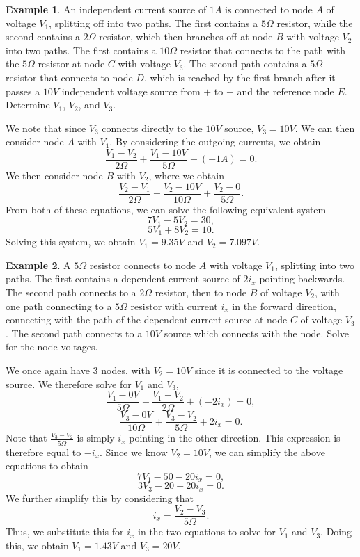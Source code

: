 \documentclass[11pt]{article}
\theoremstyle{plain} %
\theoremstyle{definition}
\theoremstyle{example}
\newtheorem*{example}{Example}
\theoremstyle{remark}
\begin{document}
\begin{example}
An independent current source of $1A$ is connected to node $A$ of voltage $V_1$, splitting off into two paths. The first contains a $5\Omega$ resistor, while the second contains a $2\Omega$ resistor, which then branches off at node $B$ with voltage $V_2$ into two paths. The first contains a $10\Omega$ resistor that connects to the path with the $5\Omega$ resistor at node $C$ with voltage $V_3$. The second path contains a $5\Omega$ resistor that connects to node $D$, which is reached by the first branch after it passes a $10V$ independent voltage source from $+$ to $-$ and the reference node $E$. Determine $V_1$, $V_2$, and $V_3$. 
\end{example}

We note that since $V_3$ connects directly to the $10V$ source, $V_3 = 10V$. We can then consider node $A$ with $V_1$. By considering the outgoing currents, we obtain 
$$\frac{V_1-V_2}{2\Omega} + \frac{V_1-10V}{5\Omega} + (-1A) = 0.$$
We then consider node $B$ with $V_2$, where we obtain
$$\frac{V_2-V_1}{2\Omega} + \frac{V_2-10V}{10\Omega} + \frac{V_2-0}{5\Omega}.$$
From both of these equations, we can solve the following equivalent system
$$7V_1-5V_2 = 30,$$
$$5V_1+8V_2 = 10.$$
Solving this system, we obtain $V_1 = 9.35V$ and $V_2 =  7.097V$. 

\begin{example}
A $5\Omega$ resistor connects to node $A$ with voltage $V_1$, splitting into two paths. The first contains a dependent current source of $2i_x$ pointing backwards. The second path connects to a $2\Omega$ resistor, then to node $B$ of voltage $V_2$, with one path connecting to a $5\Omega$ resistor with current $i_x$ in the forward direction, connecting with the path of the dependent current source at node $C$ of voltage $V_3$. The second path connects to a $10V$ source which connects with the node. Solve for the node voltages. 
\end{example}

We once again have 3 nodes, with $V_2 = 10V$ since it is connected to the voltage source. We therefore solve for $V_1$ and $V_3$,
$$\frac{V_1-0V}{5\Omega} + \frac{V_1-V_2}{2\Omega} + (-2i_x) = 0,$$
$$\frac{V_3-0V}{10\Omega} + \frac{V_3-V_2}{5\Omega} + 2i_x = 0.$$
Note that $\frac{V_3-V_2}{5\Omega}$ is simply $i_x$ pointing in the other direction. This expression is therefore equal to $-i_x$. Since we know $V_2 = 10V$, we can simplify the above equations to obtain 
$$7V_1-50-20i_x = 0,$$
$$3V_3 - 20 + 20i_x = 0.$$
We further simplify this by considering that $$i_x = \frac{V_2-V_3}{5\Omega}.$$Thus, we substitute this for $i_x$ in the two equations to solve for $V_1$ and $V_3$. Doing this, we obtain $V_1 = 1.43V$ and $V_3 = 20V$. 
\end{document}
